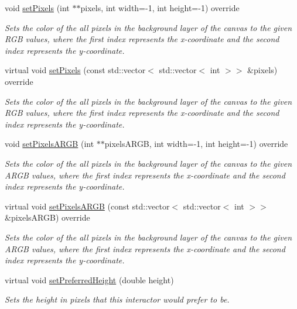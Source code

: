 \begin{DoxyCompactItemize}
void \mbox{\hyperlink{classsgl_1_1GCanvas_a9c29e6db2b5cae836612d932f7ef7146}{set\+Pixels}} (int $\ast$$\ast$pixels, int width=-\/1, int height=-\/1) override
\begin{DoxyCompactList}\small\item\em Sets the color of the all pixels in the background layer of the canvas to the given R\+GB values, where the first index represents the x-\/coordinate and the second index represents the y-\/coordinate. \end{DoxyCompactList}\item 
virtual void \mbox{\hyperlink{classsgl_1_1GCanvas_afa5e481700ddb87860c4efd815db9ab2}{set\+Pixels}} (const std\+::vector$<$ std\+::vector$<$ int $>$$>$ \&pixels) override
\begin{DoxyCompactList}\small\item\em Sets the color of the all pixels in the background layer of the canvas to the given R\+GB values, where the first index represents the x-\/coordinate and the second index represents the y-\/coordinate. \end{DoxyCompactList}\item 
void \mbox{\hyperlink{classsgl_1_1GCanvas_a7f69ab7e71de88d5fab2be7561b9a5e1}{set\+Pixels\+A\+R\+GB}} (int $\ast$$\ast$pixels\+A\+R\+GB, int width=-\/1, int height=-\/1) override
\begin{DoxyCompactList}\small\item\em Sets the color of the all pixels in the background layer of the canvas to the given A\+R\+GB values, where the first index represents the x-\/coordinate and the second index represents the y-\/coordinate. \end{DoxyCompactList}\item 
virtual void \mbox{\hyperlink{classsgl_1_1GCanvas_a8183dc852e94c60d374eb26749c4378e}{set\+Pixels\+A\+R\+GB}} (const std\+::vector$<$ std\+::vector$<$ int $>$$>$ \&pixels\+A\+R\+GB) override
\begin{DoxyCompactList}\small\item\em Sets the color of the all pixels in the background layer of the canvas to the given A\+R\+GB values, where the first index represents the x-\/coordinate and the second index represents the y-\/coordinate. \end{DoxyCompactList}\item 
virtual void \mbox{\hyperlink{classsgl_1_1GInteractor_a1ab987704fce32098706c6f00fb08218}{set\+Preferred\+Height}} (double height)
\begin{DoxyCompactList}\small\item\em Sets the height in pixels that this interactor would prefer to be. \end{DoxyCompactList}\item 

\end{DoxyCompactItemize}
